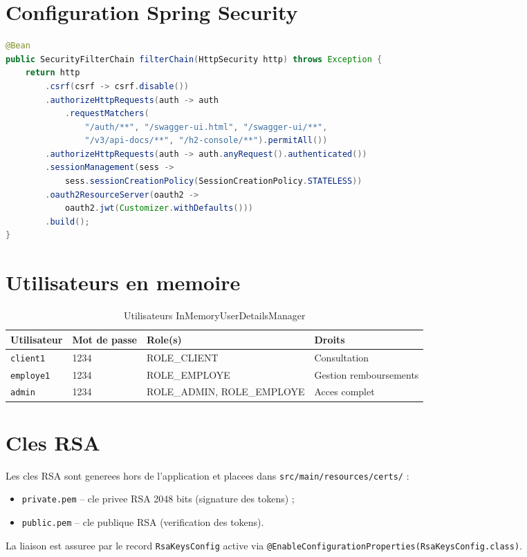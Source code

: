\documentclass[12pt,a4paper]{report}
\begin{document}
\section{Configuration Spring Security}

\begin{lstlisting}[language=Java, caption={SecurityConfig -- chaine de filtres}]
@Bean
public SecurityFilterChain filterChain(HttpSecurity http) throws Exception {
    return http
        .csrf(csrf -> csrf.disable())
        .authorizeHttpRequests(auth -> auth
            .requestMatchers(
                "/auth/**", "/swagger-ui.html", "/swagger-ui/**",
                "/v3/api-docs/**", "/h2-console/**").permitAll())
        .authorizeHttpRequests(auth -> auth.anyRequest().authenticated())
        .sessionManagement(sess ->
            sess.sessionCreationPolicy(SessionCreationPolicy.STATELESS))
        .oauth2ResourceServer(oauth2 ->
            oauth2.jwt(Customizer.withDefaults()))
        .build();
}
\end{lstlisting}

\section{Utilisateurs en memoire}

\begin{table}[h!]
\centering
\begin{tabularx}{\linewidth}{l l l X}
\toprule
\textbf{Utilisateur} & \textbf{Mot de passe} & \textbf{Role(s)} & \textbf{Droits} \\
\midrule
\texttt{client1}  & 1234 & ROLE\_CLIENT              & Consultation \\
\texttt{employe1} & 1234 & ROLE\_EMPLOYE             & Gestion remboursements \\
\texttt{admin}    & 1234 & ROLE\_ADMIN, ROLE\_EMPLOYE & Acces complet \\
\bottomrule
\end{tabularx}
\caption{Utilisateurs InMemoryUserDetailsManager}
\end{table}

\section{Cles RSA}

Les cles RSA sont generees hors de l'application et placees dans
\texttt{src/main/resources/certs/} :
\begin{itemize}
    \item \texttt{private.pem} -- cle privee RSA 2048 bits (signature des tokens) ;
    \item \texttt{public.pem}  -- cle publique RSA (verification des tokens).
\end{itemize}
La liaison est assuree par le record \texttt{RsaKeysConfig} active via
\texttt{@EnableConfigurationProperties(RsaKeysConfig.class)}.
\end{document}
